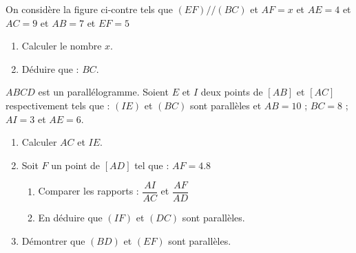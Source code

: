 \documentclass[a4paper,12pt]{article}
\begin{document}
\begin{exo}
\begin{minipage}{0.4\linewidth}
\end{minipage}
\begin{minipage}{0.6\linewidth}
On considère la figure ci-contre tels que  $(EF) // (BC)$  et  $AF=x$ et $AE=4$ et $AC=9$ et $AB=7$ et $EF=5$

\begin{enumerate}
\item Calculer le nombre $x$.
\item Déduire que : $BC$.
\end{enumerate}
\end{minipage}
\end{exo}

\begin{exo}
$ABCD$ est un parallélogramme. Soient $E$ et $I$ deux points de $[AB]$ et $[AC]$ respectivement tels que : $(IE)$ et $(BC)$ sont parallèles et $AB=10$ ; $BC=8$ ; $AI=3$ et $AE=6$.
\begin{minipage}{.55\linewidth}
\begin{enumerate}
\item Calculer $AC$ et $IE$.
\item Soit $F$ un point de $[AD]$ tel que : $AF=4.8$
\begin{enumerate}
\item Comparer les rapports : $\dfrac{AI}{AC}$ et $\dfrac{AF}{AD}$
\item En déduire que $(IF)$ et $(DC)$ sont parallèles.
\end{enumerate}
\item Démontrer que $(BD)$ et $(EF)$ sont parallèles.
\end{enumerate} 
\end{minipage}%
\begin{minipage}{.45\linewidth}
\end{minipage}

\end{exo}
\end{document}
